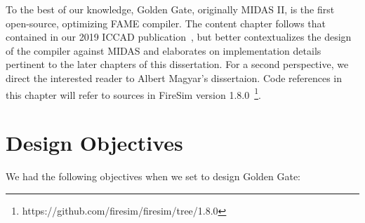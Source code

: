 To the best of our knowledge, Golden Gate, originally MIDAS II, is the first
open-source, optimizing FAME compiler. The content chapter follows that
contained in our 2019 ICCAD publication~\cite{GoldenGate}, but better
contextualizes the design of the compiler against MIDAS and elaborates on
implementation details pertinent to the later chapters of this dissertation.
For a second perspective, we direct the interested reader to Albert Magyar's
dissertaion. Code references in this chapter will refer to sources in FireSim version 1.8.0~\footnote{https://github.com/firesim/firesim/tree/1.8.0}.

\section{Design Objectives}

We had the following objectives when we set to design Golden Gate:

